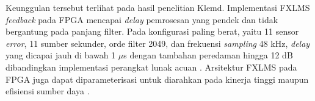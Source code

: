 Keunggulan tersebut terlihat pada hasil penelitian Klemd. Implementasi FXLMS \emph{feedback} pada FPGA mencapai \emph{delay} pemrosesan yang pendek dan tidak bergantung pada panjang filter. Pada konfigurasi paling berat, yaitu 11 sensor \emph{error}, 11 sumber sekunder, orde filter 2049, dan frekuensi \emph{sampling} 48 kHz, \emph{delay} yang dicapai jauh di bawah 1 $\mu$s dengan tambahan peredaman hingga 12 dB dibandingkan implementasi perangkat lunak acuan \parencite{klemd2023}. Arsitektur FXLMS pada FPGA juga dapat diparameterisasi untuk diarahkan pada kinerja tinggi maupun efisiensi sumber daya \parencite{klemd2021}.